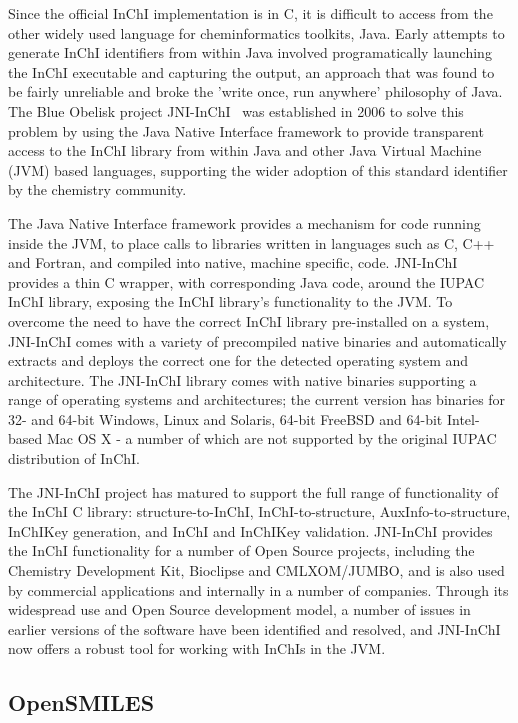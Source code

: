 \documentclass[10pt]{bmc_article}
\newenvironment{bmcformat}{\begin{raggedright}\baselineskip20pt\sloppy\setboolean{publ}{false}}{\end{raggedright}\baselineskip20pt\sloppy}
\begin{document}
\begin{bmcformat}
Since the official InChI implementation is in C, it is difficult to
access from the other widely used language for cheminformatics
toolkits, Java. Early attempts to generate InChI identifiers from
within Java involved programatically launching the InChI executable
and capturing the output, an approach that was found to be fairly
unreliable and broke the 'write once, run anywhere' philosophy
of Java.  The Blue Obelisk project JNI-InChI~\cite{WebJNIInChI}
was established in 2006 to solve this problem by using the Java Native
Interface framework to provide transparent access to the InChI
library from within Java and other Java Virtual Machine (JVM) based
languages, supporting the wider adoption of
this standard identifier by the chemistry community.

The Java Native Interface framework provides a mechanism for code
running inside the JVM, to place calls to libraries written in languages
such as C, C++ and Fortran, and compiled into native, machine specific,
code. JNI-InChI provides a thin C wrapper, with corresponding Java code,
around the IUPAC InChI library, exposing the InChI library's functionality
to the JVM.  To overcome the need to have the correct InChI library pre-installed
on a system, JNI-InChI comes with a variety of precompiled native binaries and
automatically extracts and deploys the correct one for the detected operating
system and architecture. The JNI-InChI library comes with native binaries
supporting a range of operating systems and architectures; the current version
has binaries for 32- and 64-bit Windows, Linux and Solaris, 64-bit FreeBSD
and 64-bit Intel-based Mac OS X - a number of which are not supported by the
original IUPAC distribution of InChI.

The JNI-InChI project has matured to support the full range of
functionality of the InChI C library: structure-to-InChI, InChI-to-structure,
AuxInfo-to-structure, InChIKey generation, and InChI and InChIKey validation.
JNI-InChI provides the InChI functionality for a number of Open Source projects,
including the Chemistry Development Kit, Bioclipse and CMLXOM/JUMBO, and is
also used by commercial applications and internally in a number of companies.
Through its widespread use and Open Source development model, a number of
issues in earlier versions of the software have been identified and resolved,
and JNI-InChI now offers a robust tool for working with
InChIs in the JVM.


    \subsection*{OpenSMILES}


\end{bmcformat}
\end{document}
